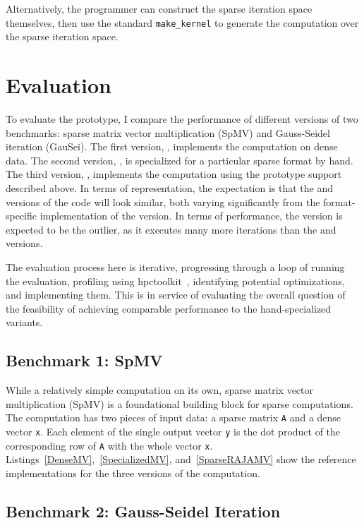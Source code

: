 Alternatively, the programmer can construct the sparse iteration space themselves, then use the standard \verb.make_kernel. to generate the computation over the sparse iteration space.

\section{Evaluation}\label{sec:sparseEval}
To evaluate the prototype, I compare the performance of different versions of two benchmarks: sparse matrix vector multiplication (SpMV) and Gauss-Seidel iteration (GauSei).
The first version, \dense, implements the computation on dense data. 
The second version, \specialized, is specialized for a particular sparse format by hand. 
The third version, \sparseraja, implements the computation using the prototype support described above.
In terms of representation, the expectation is that the \dense{} and \sparseraja{} versions of the code will look similar, both varying significantly from the format-specific implementation of the \specialized{} version.
In terms of performance, the \dense{} version is expected to be the outlier, as it executes many more iterations than the \sparseraja{} and \specialized{} versions.

The evaluation process here is iterative, progressing through a loop of running the evaluation, profiling using hpctoolkit~\cite{adhianto2010hpctoolkit}, identifying potential optimizations, and implementing them. 
This is in service of evaluating the overall question of the feasibility of achieving comparable performance to the hand-specialized variants.


\subsection{Benchmark 1: SpMV}
While a relatively simple computation on its own, sparse matrix vector multiplication (SpMV) is a foundational building block for sparse computations.
The computation has two pieces of input data: a sparse matrix \verb.A. and a dense vector \verb.x.. 
Each element of the single output vector \verb.y. is the dot product of the corresponding row of \verb.A. with the whole vector \verb.x..
Listings~\ref{DenseMV},~\ref{SpecializedMV}, and~\ref{SparseRAJAMV} show the reference implementations for the three versions of the computation.

\subsection{Benchmark 2: Gauss-Seidel Iteration}

